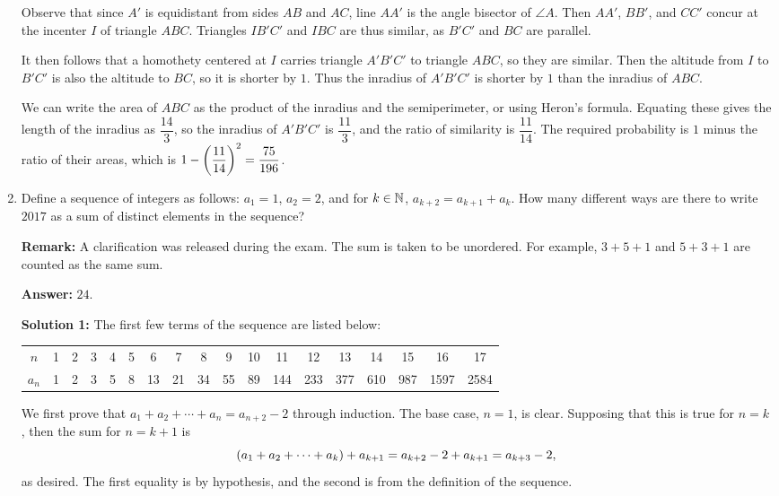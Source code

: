 \documentclass[11pt,paper=letter]{scrartcl}
\begin{document}
\begin{enumerate}[left=0pt]
Observe that since $A'$ is equidistant from sides $AB$ and $AC$, line $AA'$ is the angle bisector of $\angle A$. Then $AA'$, $BB'$, and $CC'$ concur at the incenter $I$ of triangle $ABC$. Triangles $IB'C'$ and $IBC$ are thus similar, as $B'C'$ and $BC$ are parallel.

It then follows that a homothety centered at $I$ carries triangle $A'B'C'$ to triangle $ABC$, so they are similar. Then the altitude from $I$ to $B'C'$ is also the altitude to $BC$, so it is shorter by $1$. Thus the inradius of $A'B'C'$ is shorter by $1$ than the inradius of $ABC$.

We can write the area of $ABC$ as the product of the inradius and the semiperimeter, or using Heron's formula. Equating these gives the length of the inradius as $\dfrac{14}3$, so the inradius of $A'B'C'$ is $\dfrac{11}3$, and the ratio of similarity is $\dfrac{11}{14}$. The required probability is $1$ minus the ratio of their areas, which is $1 - \left( \dfrac{11}{14} \right)^2 = \dfrac{75}{196}$.

\item Define a sequence of integers as follows: $a_1 = 1$, $a_2 = 2$, and for $k \in \mathbb N$, $a_{k+2} = a_{k+1} + a_k$. How many different ways are there to write $2017$ as a sum of distinct elements in the sequence?

\textbf{Remark:} A clarification was released during the exam. The sum is taken to be unordered. For example, $3 + 5 + 1$ and $5 + 3 + 1$ are counted as the same sum.

\textbf{Answer:} $\boxed{24}$.

\textbf{Solution 1:} The first few terms of the sequence are listed below:

\begin{center}
  \begin{tabular}{c c c c c c c c c c c c c c c c c c}
    $n$ & 1 & 2 & 3 & 4 & 5 & 6 & 7 & 8 & 9 & 10 & 11 & 12 & 13 & 14 & 15 & 16 & 17 \\
    $a_n$ & 1 & 2 & 3 & 5 & 8 & 13 & 21 & 34 & 55 & 89 & 144 & 233 & 377 & 610 & 987 & 1597 & 2584
  \end{tabular}
\end{center}

We first prove that $a_1 + a_2 + \cdots + a_n = a_{n+2} - 2$ through induction. The base case, $n = 1$, is clear. Supposing that this is true for $n = k$, then the sum for $n = k+1$ is $$\left( a_1 + a_2 + \cdots + a_k \right) + a_{k+1} = a_{k+2} - 2 + a_{k+1} = a_{k+3} - 2,$$ as desired. The first equality is by hypothesis, and the second is from the definition of the sequence.


\end{enumerate}
\end{document}
